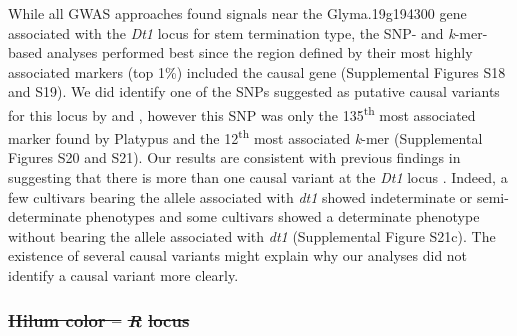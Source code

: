 \documentclass{article}
\providecommand{\DIFaddtex}[1]{{\protect\color{blue}\uwave{#1}}} %
\providecommand{\DIFdeltex}[1]{{\protect\color{red}\sout{#1}}}                      %
\providecommand{\DIFaddbegin}{} %
\providecommand{\DIFaddend}{} %
\providecommand{\DIFdelbegin}{} %
\providecommand{\DIFdelend}{} %
\providecommand{\DIFadd}[1]{\texorpdfstring{\DIFaddtex{#1}}{#1}} %
\providecommand{\DIFdel}[1]{\texorpdfstring{\DIFdeltex{#1}}{}} %
\newcommand{\DIFscaledelfig}{0.5}
\newlength{\DIFdelgraphicswidth} %
\newlength{\DIFdelgraphicsheight} %
\newcommand{\DIFaddincludegraphics}[2][]{{\color{blue}\fbox{\DIFOincludegraphics[#1]{#2}}}} %
\newcommand{\DIFdelincludegraphics}[2][]{%
\sbox{\DIFdelgraphicsbox}{\DIFOincludegraphics[#1]{#2}}%
\settoboxwidth{\DIFdelgraphicswidth}{\DIFdelgraphicsbox} %
\settoboxtotalheight{\DIFdelgraphicsheight}{\DIFdelgraphicsbox} %
\scalebox{\DIFscaledelfig}{%
\parbox[b]{\DIFdelgraphicswidth}{\usebox{\DIFdelgraphicsbox}\\[-\baselineskip] \rule{\DIFdelgraphicswidth}{0em}}\llap{\resizebox{\DIFdelgraphicswidth}{\DIFdelgraphicsheight}{%
\setlength{\unitlength}{\DIFdelgraphicswidth}%
\begin{picture}(1,1)%
\thicklines\linethickness{2pt} %
{\color[rgb]{1,0,0}\put(0,0){\framebox(1,1){}}}%
{\color[rgb]{1,0,0}\put(0,0){\line( 1,1){1}}}%
{\color[rgb]{1,0,0}\put(0,1){\line(1,-1){1}}}%
\end{picture}%
}\hspace*{3pt}}} %
} %
\DeclareRobustCommand{\DIFaddbegin}{\DIFOaddbegin \let\includegraphics\DIFaddincludegraphics} %
\DeclareRobustCommand{\DIFaddend}{\DIFOaddend \let\includegraphics\DIFOincludegraphics} %
\DeclareRobustCommand{\DIFdelbegin}{\DIFOdelbegin \let\includegraphics\DIFdelincludegraphics} %
\DeclareRobustCommand{\DIFdelend}{\DIFOaddend \let\includegraphics\DIFOincludegraphics} %
\begin{document}
\DIFdelend While all GWAS approaches found signals near the Glyma.19g194300 gene
associated with the \textit{Dt1} locus for stem termination type, the SNP- and
\textit{k}-mer-based analyses performed best since the region defined by their
most highly associated markers (top 1\%) included the causal gene (Supplemental Figures
S18 and S19).
We did identify one of the SNPs suggested as putative causal variants for this
locus by  and , however this SNP was only the
135\textsuperscript{th} most associated marker found by Platypus and the
12\textsuperscript{th} most associated \emph{k}-mer (Supplemental Figures
S20 and S21).
Our results are consistent with previous findings in suggesting that there is
more than one causal variant at the \textit{Dt1} locus . Indeed, a few cultivars bearing the allele associated with
\emph{dt1} showed indeterminate or semi-determinate phenotypes and some
cultivars showed a determinate phenotype without bearing the allele associated
with \emph{dt1} (Supplemental Figure S21c). The existence of
several causal variants might explain why our analyses did not identify a
causal variant more clearly.

\DIFdelbegin \subsubsection*{\DIFdel{Hilum color -- }\textit{\DIFdel{R}} %
\DIFdel{locus}}
\DIFdelend \DIFaddbegin \subsubsection{\DIFadd{Hilum color -- }\textit{\DIFadd{R}} \DIFadd{locus}}
\DIFaddend 
\end{document}
